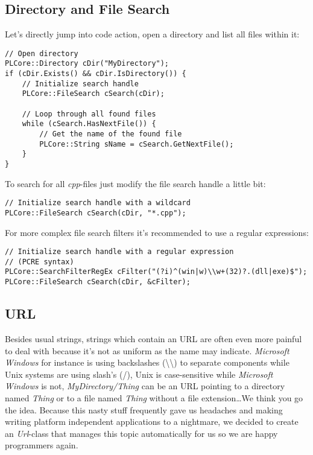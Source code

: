 \subsection{Directory and File Search}
Let's directly jump into code action, open a directory and list all files within it:

\begin{lstlisting}[caption=Directory and file search usage example]
// Open directory
PLCore::Directory cDir("MyDirectory");
if (cDir.Exists() && cDir.IsDirectory()) {
	// Initialize search handle
	PLCore::FileSearch cSearch(cDir);

	// Loop through all found files
	while (cSearch.HasNextFile()) {
		// Get the name of the found file
		PLCore::String sName = cSearch.GetNextFile();
	}
}
\end{lstlisting}

To search for all \emph{cpp}-files just modify the file search handle a little bit:

\begin{lstlisting}[caption=Wildcard search handle]
// Initialize search handle with a wildcard
PLCore::FileSearch cSearch(cDir, "*.cpp");
\end{lstlisting}

For more complex file search filters it's recommended to use a regular expressions:

\begin{lstlisting}[caption=Regular expression search handle]
// Initialize search handle with a regular expression
// (PCRE syntax)
PLCore::SearchFilterRegEx cFilter("(?i)^(win|w)\\w+(32)?.(dll|exe)$");
PLCore::FileSearch cSearch(cDir, &cFilter);
\end{lstlisting}




\subsection{\ac{URL}}
Besides usual strings, strings which contain an \ac{URL} are often even more painful to deal with because it's not as uniform as the name may indicate. \emph{Microsoft Windows} for instance is using backslashes (\textbackslash\textbackslash) to separate components while Unix systems are using slash's (/), Unix is case-sensitive while \emph{Microsoft Windows} is not, \emph{MyDirectory/Thing} can be an \ac{URL} pointing to a directory named \emph{Thing} or to a file named \emph{Thing} without a file extension\ldots We think you go the idea. Because this nasty stuff frequently gave us headaches and making writing platform independent applications to a nightmare, we decided to create an \emph{Url}-class that manages this topic automatically for us so we are happy programmers again.

